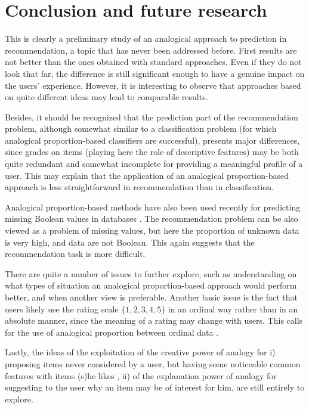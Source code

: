 \documentclass{llncs}
\begin{document}
\section{Conclusion and future research}\label{conc}

This is clearly a preliminary study of an analogical approach to prediction in
recommendation, a topic that has never been addressed before. First results are
not better than the ones obtained with standard approaches. Even if they do not
look that far, the difference is still significant enough to have a genuine
impact on the users' experience. However, it is interesting to observe that
approaches based on quite different ideas may lead to comparable results.

Besides, it should be recognized that the prediction part of the recommendation
problem, although somewhat similar to a classification problem (for which
analogical proportion-based classifiers are successful), presents major
differences, since grades on items (playing here the role of descriptive
features) may be both quite redundant and somewhat incomplete for providing a
meaningful profile of a user. This may explain that the application of an
analogical proportion-based approach is less straightforward in recommendation
than in classification. 

Analogical proportion-based methods have also been used recently for predicting
missing Boolean values in databases \cite{DBLP:conf/ipmu/BeltranJP14}. The
recommendation problem can be also viewed as a problem of missing values, but
here the proportion of unknown data is very high, and data are not Boolean. This again suggests that the recommendation task is more difficult.

There are quite a number of issues to further explore, such as understanding on
what types of situation an analogical proportion-based approach would perform
better, and when another view is preferable. Another basic issue is the fact
that users likely use the rating scale $\{1, 2, 3, 4, 5\}$ in an ordinal way
rather than in an absolute manner, since the meaning of a rating may change
with users. This calls for the use of analogical proportion between ordinal
data \cite{MicletBarbot09}.

Lastly, the ideas of the exploitation of the creative power of analogy for i)
proposing items never considered by a user, but having some noticeable common
features with items (s)he likes \cite{Takagi2011}, ii) of the explanation power
of analogy for suggesting to the user why an item may be of interest for him,
are still entirely to explore.

\newpage



\end{document}
